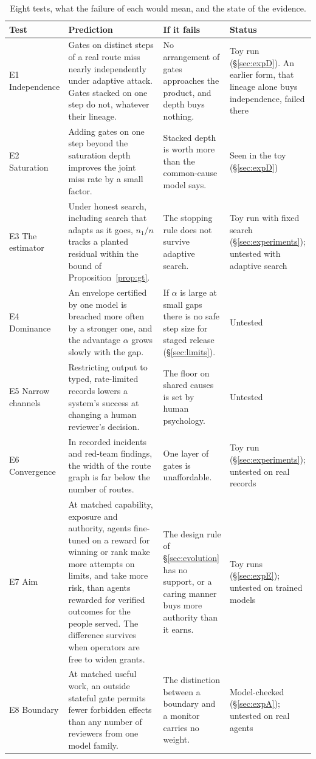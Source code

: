 \documentclass[10pt,twocolumn]{article}
\theoremstyle{plain}
\theoremstyle{definition}
\begin{document}
\begin{table}[t]
\centering
\footnotesize
\setlength{\tabcolsep}{5pt}
\renewcommand{\arraystretch}{1.16}
\begin{tabularx}{\textwidth}{@{}P{0.82in}LLP{1.5in}@{}}
\toprule
\textbf{Test} & \textbf{Prediction} & \textbf{If it fails} & \textbf{Status}\\
\midrule
E1 Independence & Gates on distinct steps of a real route miss nearly independently under adaptive attack. Gates stacked on one step do not, whatever their lineage. & No arrangement of gates approaches the product, and depth buys nothing. & Toy run (\S\ref{sec:expD}). An earlier form, that lineage alone buys independence, failed there\\
E2 Saturation & Adding gates on one step beyond the saturation depth improves the joint miss rate by a small factor. & Stacked depth is worth more than the common-cause model says. & Seen in the toy (\S\ref{sec:expD})\\
E3 The estimator & Under honest search, including search that adapts as it goes, $n_{1}/n$ tracks a planted residual within the bound of Proposition~\ref{prop:gt}. & The stopping rule does not survive adaptive search. & Toy run with fixed search (\S\ref{sec:experiments}); untested with adaptive search\\
E4 Dominance & An envelope certified by one model is breached more often by a stronger one, and the advantage $\alpha$ grows slowly with the gap. & If $\alpha$ is large at small gaps there is no safe step size for staged release (\S\ref{sec:limits}). & Untested\\
E5 Narrow channels & Restricting output to typed, rate-limited records lowers a system's success at changing a human reviewer's decision. & The floor on shared causes is set by human psychology. & Untested\\
E6 Convergence & In recorded incidents and red-team findings, the width of the route graph is far below the number of routes. & One layer of gates is unaffordable. & Toy run (\S\ref{sec:experiments}); untested on real records\\
E7 Aim & At matched capability, exposure and authority, agents fine-tuned on a reward for winning or rank make more attempts on limits, and take more risk, than agents rewarded for verified outcomes for the people served. The difference survives when operators are free to widen grants. & The design rule of \S\ref{sec:evolution} has no support, or a caring manner buys more authority than it earns. & Toy runs (\S\ref{sec:expE}); untested on trained models\\
E8 Boundary & At matched useful work, an outside stateful gate permits fewer forbidden effects than any number of reviewers from one model family. & The distinction between a boundary and a monitor carries no weight. & Model-checked (\S\ref{sec:expA}); untested on real agents\\
\bottomrule
\end{tabularx}
\caption{Eight tests, what the failure of each would mean, and the state of the evidence.}
\label{tab:tests}
\end{table}
\end{document}
